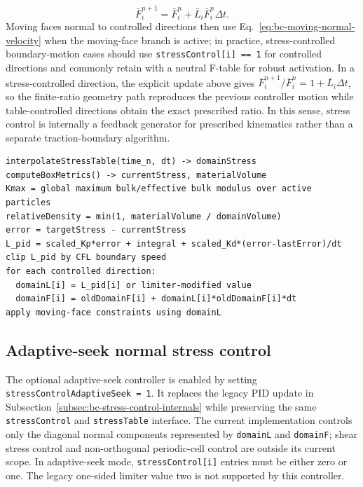 \begin{equation}
  \bar F_i^{n+1}=\bar F_i^n+\bar L_i\bar F_i^n\Delta t.
\end{equation}
Moving faces normal to controlled directions then use Eq.~\eqref{eq:bc-moving-normal-velocity} when the moving-face branch is active; in practice, stress-controlled boundary-motion cases should use \texttt{stressControl[i] == 1} for controlled directions and commonly retain  with a neutral F-table for robust activation.  In a stress-controlled direction, the explicit update above gives $\bar F_i^{n+1}/\bar F_i^n=1+\bar L_i\Delta t$, so the finite-ratio geometry path reproduces the previous controller motion while table-controlled directions obtain the exact prescribed ratio.  In this sense, stress control is internally a feedback generator for prescribed kinematics rather than a separate traction-boundary algorithm.

\begin{lstlisting}[caption={Stress-control path to boundary motion.}]
interpolateStressTable(time_n, dt) -> domainStress
computeBoxMetrics() -> currentStress, materialVolume
Kmax = global maximum bulk/effective bulk modulus over active particles
relativeDensity = min(1, materialVolume / domainVolume)
error = targetStress - currentStress
L_pid = scaled_Kp*error + integral + scaled_Kd*(error-lastError)/dt
clip L_pid by CFL boundary speed
for each controlled direction:
  domainL[i] = L_pid[i] or limiter-modified value
  domainF[i] = oldDomainF[i] + domainL[i]*oldDomainF[i]*dt
apply moving-face constraints using domainL
\end{lstlisting}

\subsection{Adaptive-seek normal stress control}
\label{subsec:bc-adaptive-seek-stress-control}

The optional adaptive-seek controller is enabled by setting
\texttt{stressControlAdaptiveSeek = 1}.  It replaces the legacy PID update in
Subsection~\ref{subsec:bc-stress-control-internals} while preserving the same
\texttt{stressControl} and \texttt{stressTable} interface.  The current
implementation controls only the diagonal normal components represented by
\texttt{domainL} and \texttt{domainF}; shear stress control and non-orthogonal
periodic-cell control are outside its current scope.  In adaptive-seek mode,
\texttt{stressControl[i]} entries must be either zero or one.  The legacy
one-sided limiter value two is not supported by this controller.

